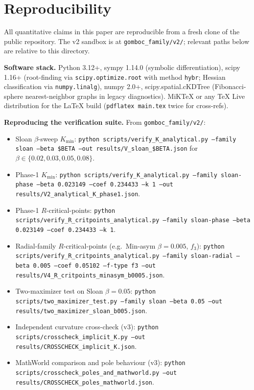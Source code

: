 \documentclass[11pt,a4paper]{article}
\begin{document}
\section{Reproducibility}
\label{sec:reproducibility}

All quantitative claims in this paper are reproducible from a fresh
clone of the public repository. The v2 sandbox is at
\texttt{gomboc\_family/v2/}; relevant paths below are relative to
this directory.

\textbf{Software stack.} Python 3.12+, sympy 1.14.0 (symbolic
differentiation), scipy 1.16+ (root-finding via \texttt{scipy.optimize.root}
with method \texttt{hybr}; Hessian classification via \texttt{numpy.linalg}),
numpy 2.0+, scipy.spatial.cKDTree (Fibonacci-sphere nearest-neighbor
graphs in legacy diagnostics). MiKTeX or any TeX Live distribution
for the LaTeX build (\texttt{pdflatex main.tex} twice for cross-refs).

\textbf{Reproducing the verification suite.} From \texttt{gomboc\_family/v2/}:

\begin{itemize}[nosep,leftmargin=*]
\item Sloan $\beta$-sweep $K_{\min}$:
\texttt{python scripts/verify\_K\_analytical.py --family sloan --beta \$BETA --out results/V\_sloan\_\$BETA.json}
for $\beta \in \{0.02, 0.03, 0.05, 0.08\}$.

\item Phase-1 $K_{\min}$: \texttt{python scripts/verify\_K\_analytical.py
--family sloan-phase --beta 0.023149 --coef 0.234433 --k 1 --out results/V2\_analytical\_K\_phase1.json}.

\item Phase-1 $R$-critical-points:
\texttt{python scripts/verify\_R\_critpoints\_analytical.py
--family sloan-phase --beta 0.023149 --coef 0.234433 --k 1}.

\item Radial-family $R$-critical-points (e.g.\ Min-asym $\beta = 0.005$,
$f_3$): \texttt{python scripts/verify\_R\_critpoints\_analytical.py
--family sloan-radial --beta 0.005 --coef 0.05102 --f-type f3
--out results/V4\_R\_critpoints\_minasym\_b0005.json}.

\item Two-maximizer test on Sloan $\beta = 0.05$:
\texttt{python scripts/two\_maximizer\_test.py --family sloan
--beta 0.05 --out results/two\_maximizer\_sloan\_b005.json}.

\item Independent curvature cross-check (v3):
\texttt{python scripts/crosscheck\_implicit\_K.py
--out results/CROSSCHECK\_implicit\_K.json}.

\item MathWorld comparison and pole behaviour (v3):
\texttt{python scripts/crosscheck\_poles\_and\_mathworld.py
--out results/CROSSCHECK\_poles\_mathworld.json}.
\end{itemize}
\end{document}
